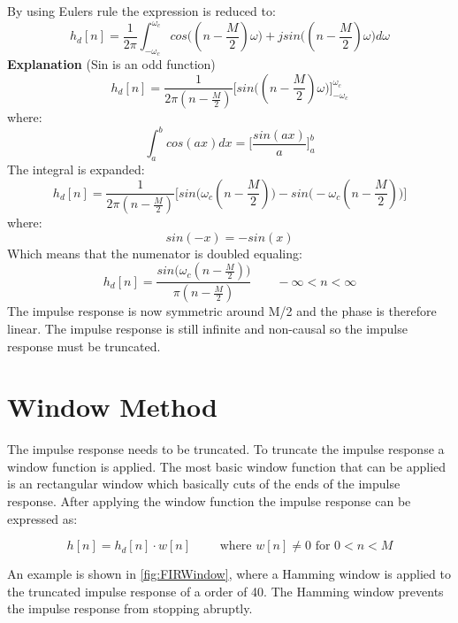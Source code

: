 By using Eulers rule the expression is reduced to:
\begin{equation}
h_d[n]=\frac{1}{2\pi}\int_{-\omega_c}^{\omega_c}cos\Big((n-\frac{M}{2})\omega\Big)+jsin\Big((n-\frac{M}{2})\omega\Big) d\omega
\end{equation}
\textbf{Explanation} (Sin is an odd function)
\begin{equation}
h_d[n]=\frac{1}{2\pi(n-\frac{M}{2})}\bigg[sin\Big((n-\frac{M}{2})\omega\Big)\bigg]_{-\omega_{c}}^{\omega_{c}}
\end{equation}
where:
\begin{equation}
\int_{a}^{b}cos(ax) dx = \Big[\frac{sin(ax)}{a}\Big]_{a}^{b}
\end{equation}
The integral is expanded:
\begin{equation}
h_d[n]=\frac{1}{2\pi(n-\frac{M}{2})}\bigg[sin\Big(\omega_c(n-\frac{M}{2})\Big)-sin\Big(-\omega_c(n-\frac{M}{2})\Big)\bigg]
\end{equation}
where:
\begin{equation}
sin(-x) = -sin(x)
\end{equation}
Which means that the numenator is doubled equaling:
\begin{equation}
h_d[n]=\frac{sin\Big(\omega_c(n-\frac{M}{2})\Big)}{\pi(n-\frac{M}{2})}\qquad-\infty<n<\infty
\end{equation}
The impulse response is now symmetric around M/2 and the phase is therefore linear. The impulse response is still infinite and non-causal so the impulse response must be truncated.


\section{Window Method}
The impulse response needs to be truncated. To truncate the impulse response a window function is applied. The most basic window function that can be applied is an rectangular window which basically cuts of the ends of the impulse response. After applying the window function the impulse response can be expressed as:

\begin{equation}
h[n]=h_d[n]\cdot w[n]\qquad\textrm{ where } w[n]\neq0 \textrm{ for } 0<n<M
\end{equation}

An example is shown in \autoref{fig:FIRWindow}, where a Hamming window is applied to the truncated impulse response of a order of 40. The Hamming window prevents the impulse response from stopping abruptly.

